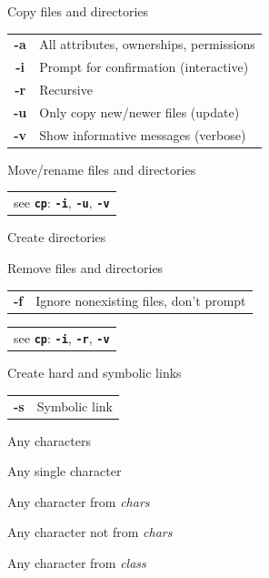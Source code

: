 \documentclass[12pt, a4paper]
{article}
\begin{document}
\begin{multicols}{3}
\begin{description}[nolistsep]
	\item[cp] Copy files and directories
	\item
	\begin{tabular}{cl}
		{\large \ttfamily \textbf{-a}} & All attributes, ownerships, permissions \\
		{\large \ttfamily \textbf{-i}} & Prompt for confirmation (interactive)\\
		{\large \ttfamily \textbf{-r}} & Recursive \\
		{\large \ttfamily \textbf{-u}} & Only copy new/newer files (update) \\
		{\large \ttfamily \textbf{-v}} & Show informative messages (verbose)\\
	\end{tabular}
	\item[mv] Move/rename files and directories
	\item
	\begin{tabular}{l}
		see \texttt{\textbf{cp}}: \texttt{\textbf{-i}}, \texttt{\textbf{-u}}, \texttt{\textbf{-v}}
	\end{tabular}
	\item[mkdir] Create directories
	\item[rm] Remove files and directories
	\item
	\begin{tabular}{cl}
		{\large \ttfamily \textbf{-f}} & Ignore nonexisting files, don't prompt
	\end{tabular}
	\item
	\begin{tabular}{l}
		see \texttt{\textbf{cp}}: \texttt{\textbf{-i}}, \texttt{\textbf{-r}}, \texttt{\textbf{-v}}
	\end{tabular}
	\item[ln] Create hard and symbolic links
	\item
	\begin{tabular}{cl}
		{\large \ttfamily \textbf{-s}} & Symbolic link
	\end{tabular}
\end{description}


\begin{description}[nolistsep]
	\item[*] Any characters
	\item[?] Any single character
	\item[{[\large \textit{chars}}{\Large]}] Any character from \textit{chars}
	\item[{[\large!\textit{chars}}{\Large]}] Any character not from \textit{chars}
	\item[{[\large:\textit{class}:}{\Large]}] Any character from \textit{class}
\end{description}


\end{multicols}
\end{document}
